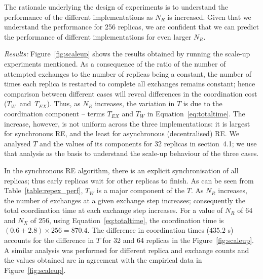 \documentclass{rspublic}
\newcommand{\jhanote}[1]{ {\textcolor{red} { ***shantenu: #1 }}}
\newcommand{\alnote}[1]{ {\textcolor{blue} { ***andre: #1 }}}
\newcommand{\athotanote}[1]{ {\textcolor{green} { ***athota: #1 }}}
\newcommand{\alnote}[1]{}
\newcommand{\athotanote}[1]{}
\newcommand{\jhanote}[1]{}
\begin{document}
The rationale underlying the design of experiments is to understand
the performance of the different implementations as $N_R$ is
increased. Given that we understand the performance for 256 replicas,
we are confident that we can predict the performance of different
implementations for even larger $N_R$.



{\it Results:} Figure~\ref{fig:scaleup} shows the results obtained by
running the scale-up experiments mentioned.  %
As a consequence of the ratio of the number of attempted exchanges to
the number of replicas being a constant, the number of times each
replica is restarted to complete all exchanges remains constant; hence
comparison between different cases will reveal differences in the
coordination cost ($T_W$~and~$T_{EX}$).  Thus, as $N_R$ increases, the
variation in $T$ is due to the coordination component -- terms
$T_{EX}$ and $T_W$ in Equation~\ref{eq:totaltime}.  The increase,
however, is not uniform across the three implementations: it is
largest for synchronous RE, and the least for asynchronous
(decentralised) RE.  We analysed $T$ and the values of its components
for 32 replicas in section~4.1; we use that analysis as the basis to
understand the scale-up behaviour of the three cases.
 
In the synchronous RE algorithm, there is an explicit synchronisation
of all replicas; thus early replicas wait for other replicas to
finish. As can be seen from Table~\ref{table:repex_perf}, $T_W$ is a
major component of the $T$.  As $N_R$ increases, the number of
exchanges at a given exchange step increases; consequently the total
coordination time at each exchange step increases.  For a value of
$N_R$ of 64 and $N_X$ of 256, using Equation~\ref{eq:totaltime}, the
coordination time is $(0.6+2.8) \times 256 = 870.4$.  The difference
in coordination times ($435.2$ s) accounts for the difference
in $T$ for 32 and 64 replicas in the
Figure~\ref{fig:scaleup}. %
A similar analysis was performed for different replica and exchange
counts and the values obtained are in agreement with the empirical
data in Figure~\ref{fig:scaleup}.
\end{document}
